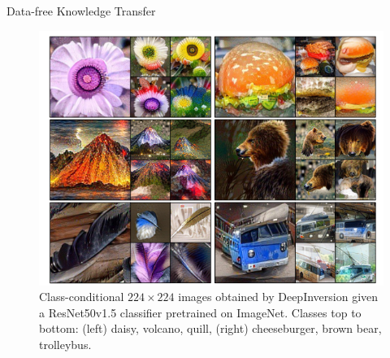 \documentclass{beamer}
\begin{document}
\begin{frame}{Data-free Knowledge Transfer}
    \begin{figure}
        \centering
        \includegraphics[scale=0.65]{images/distill8.png}
        \caption{Class-conditional $224 \times 224$ images obtained by DeepInversion given a ResNet50v1.5 classifier pretrained on ImageNet. Classes top to bottom: (left) daisy, volcano, quill, (right) cheeseburger, brown bear, trolleybus.}
        \label{fig:enter-label}
    \end{figure} 
\end{frame}
\end{document}
